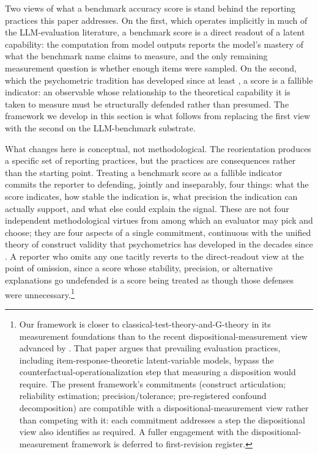 \documentclass[11pt]{article}
\begin{document}
Two views of what a benchmark accuracy score is stand behind the
reporting practices this paper addresses. On the first, which
operates implicitly in much of the LLM-evaluation literature, a
benchmark score is a direct readout of a latent capability: the
computation from model outputs reports the model's mastery of what
the benchmark name claims to measure, and the only remaining
measurement question is whether enough items were sampled. On the
second, which the psychometric tradition has developed since at
least \citet{cronbachmeehl1955}, a score is a fallible indicator:
an observable whose relationship to the theoretical capability it
is taken to measure must be structurally defended rather than
presumed. The framework we develop in this section is what follows
from replacing the first view with the second on the LLM-benchmark
substrate.

What changes here is conceptual, not methodological. The
reorientation produces a specific set of reporting practices, but
the practices are consequences rather than the starting point. Treating a benchmark score as a fallible indicator
commits the reporter to defending, jointly and inseparably, four
things: what the score indicates, how stable the indication is,
what precision the indication can actually support, and what else
could explain the signal. These are not four independent
methodological virtues from among which an evaluator may pick and
choose; they are four aspects of a single commitment, continuous
with the unified theory of construct validity
\citep{messick1989validity, messick1995validity} that psychometrics
has developed in the decades since \citet{cronbachmeehl1955}. A
reporter who omits any one tacitly reverts to the direct-readout
view at the point of omission, since a score whose stability,
precision, or alternative explanations go undefended is a score
being treated as though those defenses were unnecessary.\footnote{Our
framework is closer to classical-test-theory-and-G-theory in its
measurement foundations than to the recent dispositional-measurement
view advanced by \citet{voudouris2026measurementscience}. That paper
argues that prevailing evaluation practices, including item-response-theoretic
latent-variable models, bypass the counterfactual-operationalization
step that measuring a disposition would require. The present
framework's commitments (construct articulation; reliability
estimation; precision/tolerance; pre-registered confound decomposition)
are compatible with a dispositional-measurement view rather than
competing with it: each commitment addresses a step the dispositional
view also identifies as required. A fuller engagement with the
dispositional-measurement framework is deferred to first-revision
register.}
\end{document}
